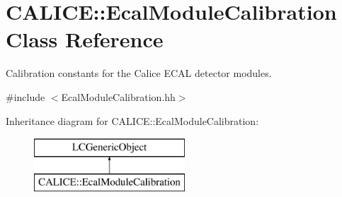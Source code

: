\section{C\-A\-L\-I\-C\-E\-:\-:Ecal\-Module\-Calibration Class Reference}
\label{classCALICE_1_1EcalModuleCalibration}


Calibration constants for the Calice E\-C\-A\-L detector modules.  




{\ttfamily \#include $<$Ecal\-Module\-Calibration.\-hh$>$}

Inheritance diagram for C\-A\-L\-I\-C\-E\-:\-:Ecal\-Module\-Calibration\-:\begin{figure}[H]
\begin{center}
\leavevmode
\includegraphics[height=2.000000cm]{classCALICE_1_1EcalModuleCalibration}
\end{center}
\end{figure}
